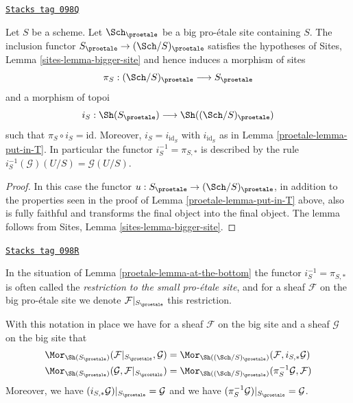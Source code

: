 \begin{lemma}
\label{proetale-lemma-at-the-bottom}
\href{https://stacks.math.columbia.edu/tag/098Q}{\texttt{Stacks tag 098Q}}

Let $S$ be a scheme. Let $\Sch_\proetale$ be a big pro-\'etale
site containing $S$.
The inclusion functor $S_\proetale \to (\Sch/S)_\proetale$
satisfies the hypotheses of Sites, Lemma \ref{sites-lemma-bigger-site}
and hence induces a morphism of sites
$$
\pi_S : (\Sch/S)_\proetale \longrightarrow S_\proetale
$$
and a morphism of topoi
$$
i_S : \Sh(S_\proetale) \longrightarrow \Sh((\Sch/S)_\proetale)
$$
such that $\pi_S \circ i_S = \text{id}$. Moreover, $i_S = i_{\text{id}_S}$
with $i_{\text{id}_S}$ as in Lemma \ref{proetale-lemma-put-in-T}. In particular the
functor $i_S^{-1} = \pi_{S, *}$ is described by the rule
$i_S^{-1}(\mathcal{G})(U/S) = \mathcal{G}(U/S)$.
\end{lemma}

\begin{proof}

In this case the functor $u : S_\proetale \to (\Sch/S)_\proetale$,
in addition to the properties seen in the proof of
Lemma \ref{proetale-lemma-put-in-T} above, also is fully faithful
and transforms the final object into the final object.
The lemma follows from Sites, Lemma \ref{sites-lemma-bigger-site}.
\end{proof}

\begin{definition}
\label{proetale-definition-restriction-small-proetale}
\href{https://stacks.math.columbia.edu/tag/098R}{\texttt{Stacks tag 098R}}

In the situation of
Lemma \ref{proetale-lemma-at-the-bottom}
the functor $i_S^{-1} = \pi_{S, *}$ is often
called the {\it restriction to the small pro-\'etale site}, and for a sheaf
$\mathcal{F}$ on the big pro-\'etale site we denote
$\mathcal{F}|_{S_\proetale}$ this restriction.
\end{definition}

With this notation in place we have for a sheaf $\mathcal{F}$ on the
big site and a sheaf $\mathcal{G}$ on the big site that
\begin{align*}
\Mor_{\Sh(S_\proetale)}(\mathcal{F}|_{S_\proetale}, \mathcal{G})
& =
\Mor_{\Sh((\Sch/S)_\proetale)}(\mathcal{F},
i_{S, *}\mathcal{G}) \\
\Mor_{\Sh(S_\proetale)}(\mathcal{G}, \mathcal{F}|_{S_\proetale})
& =
\Mor_{\Sh((\Sch/S)_\proetale)}(\pi_S^{-1}\mathcal{G}, \mathcal{F})
\end{align*}
Moreover, we have $(i_{S, *}\mathcal{G})|_{S_\proetale} = \mathcal{G}$
and we have $(\pi_S^{-1}\mathcal{G})|_{S_\proetale} = \mathcal{G}$.


